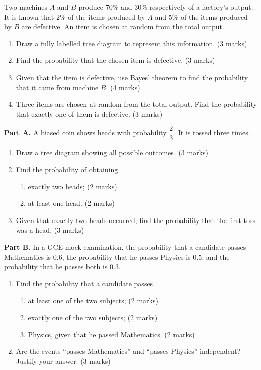 \documentclass[11pt]{article}
\begin{document}
\begin{exercice}
Two machines $A$ and $B$ produce $70\%$ and $30\%$ respectively of a factory's output. It is known that $2\%$ of the items produced by $A$ and $5\%$ of the items produced by $B$ are defective. An item is chosen at random from the total output.
\begin{enumerate}
\item Draw a fully labelled tree diagram to represent this information. \hfill (3 marks)
\item Find the probability that the chosen item is defective. \hfill (3 marks)
\item Given that the item is defective, use Bayes' theorem to find the probability that it came from machine $B$. \hfill (4 marks)
\item Three items are chosen at random from the total output. Find the probability that exactly one of them is defective. \hfill (3 marks)
\end{enumerate}
\end{exercice}

\begin{exercice}
\textbf{Part A.} A biased coin shows heads with probability $\dfrac{2}{3}$. It is tossed three times.
\begin{enumerate}
\item Draw a tree diagram showing all possible outcomes. \hfill (3 marks)
\item Find the probability of obtaining
\begin{enumerate}
\item exactly two heads; \hfill (2 marks)
\item at least one head. \hfill (2 marks)
\end{enumerate}
\item Given that exactly two heads occurred, find the probability that the first toss was a head. \hfill (3 marks)
\end{enumerate}
\textbf{Part B.} In a GCE mock examination, the probability that a candidate passes Mathematics is $0.6$, the probability that he passes Physics is $0.5$, and the probability that he passes both is $0.3$.
\begin{enumerate}
\item Find the probability that a candidate passes
\begin{enumerate}
\item at least one of the two subjects; \hfill (2 marks)
\item exactly one of the two subjects; \hfill (2 marks)
\item Physics, given that he passed Mathematics. \hfill (2 marks)
\end{enumerate}
\item Are the events ``passes Mathematics'' and ``passes Physics'' independent? Justify your answer. \hfill (3 marks)
\end{enumerate}
\end{exercice}
\end{document}
